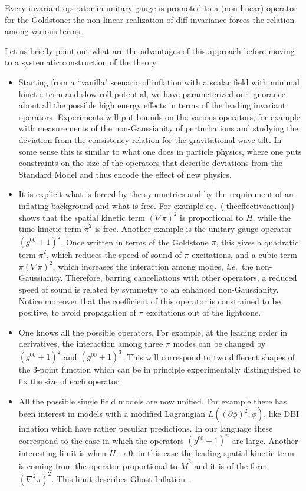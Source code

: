 \documentclass[12pt,letterpaper]{article}
\begin{document}
{Every invariant operator in unitary gauge is promoted to a
(non-linear) operator for the Goldstone: the non-linear realization of
diff invariance forces the relation among various terms.

Let us briefly point out what are the advantages of this approach before moving to a systematic construction of the theory.
\begin{itemize}
\item Starting from a ``vanilla" scenario of inflation with a scalar field with minimal kinetic term and slow-roll potential, we have parameterized our ignorance about all the possible high energy effects in terms of the leading invariant operators. Experiments will put bounds on the various operators, for example with measurements of the non-Gaussianity of perturbations and studying the deviation from the consistency relation for the gravitational wave tilt. In some sense this is similar to what one does in particle physics, where one puts constraints on the size of the operators that describe deviations from the Standard Model and thus encode the effect of new physics.

\item It is explicit what is forced by the symmetries and by the requirement of an inflating background and what is free. For example eq.~(\ref{theeffectiveaction}) shows that the spatial kinetic term $(\nabla \pi)^2$ is proportional to $\dot H$, while the time kinetic term $\dot\pi^2$ is free. Another example is the unitary gauge operator $(g^{00}+1)^2$. Once written in terms of the Goldstone $\pi$, this gives a quadratic term $\dot\pi^2$, which reduces the speed of sound of $\pi$ excitations, and a cubic term $\dot\pi (\nabla\pi)^2$, which increases the interaction among modes, {\em i.e.~}the non-Gaussianity. Therefore, barring cancellations with other operators, a reduced speed of sound is related by symmetry to an enhanced non-Gaussianity. Notice moreover that the coefficient of this operator is constrained to be positive, to avoid propagation of $\pi$ excitations out of the lightcone. 

\item One knows all the possible operators. For example, at the leading order in derivatives, the interaction among three $\pi$ modes can be changed by $(g^{00}+1)^2$ and $(g^{00}+1)^3$. This will correspond to two different shapes of the 3-point function which can be in principle experimentally distinguished to fix the size of each operator. 

\item All the possible single field models are now unified. For
  example there has been interest in models with a modified Lagrangian
  $L((\partial\phi)^2,\phi)$, like DBI inflation
  \cite{Alishahiha:2004eh,Chen:2005ad,Shandera:2006ax,Kecskemeti:2006cg,Shiu:2006kj} which have rather peculiar predictions. In our language these correspond to the case in which the operators $(g^{00}+1)^n$ are large. Another interesting limit is when $\dot H \to 0$; in this case the leading spatial kinetic term is coming from the operator proportional to $\bar M^2$ and it is of the form $(\nabla^2 \pi)^2$. This limit describes Ghost Inflation \cite{Arkani-Hamed:2003uz}.


\end{itemize}}
\end{document}

